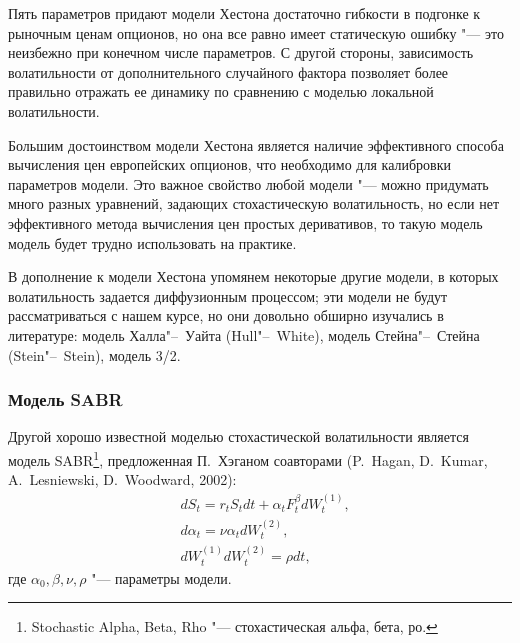 Пять параметров придают модели Хестона достаточно гибкости в подгонке к рыночным ценам опционов, но она все равно имеет статическую ошибку "--- это неизбежно при конечном числе параметров.
С другой стороны, зависимость волатильности от дополнительного случайного фактора позволяет более правильно отражать ее динамику по сравнению с моделью локальной волатильности. 

Большим достоинством модели Хестона является наличие эффективного способа вычисления цен европейских опционов, что необходимо для калибровки параметров модели.
Это важное свойство любой модели "--- можно придумать много разных уравнений, задающих стохастическую волатильность, но если нет эффективного метода вычисления цен простых деривативов, то такую модель модель будет трудно использовать на практике.


В дополнение к модели Хестона упомянем некоторые другие модели, в которых волатильность задается диффузионным процессом; эти модели не будут рассматриваться с нашем курсе, но они довольно обширно изучались в литературе: модель Халла"--~Уайта (Hull"--~White), модель Стейна"--~Стейна (Stein"--~Stein), модель 3/2.


\subsubsection{Модель SABR}

Другой хорошо известной моделью стохастической волатильности является модель SABR\footnote{Stochastic Alpha, Beta, Rho "--- стохастическая альфа, бета, ро.}, предложенная П.~Хэганом  соавторами (P.~Hagan, D.~Kumar, A.~Lesniewski, D.~Woodward, 2002):
\begin{align*}
&d S_t = r_t S_t dt + \alpha_t F_t^\beta d W_t^{(1)},\\
&d\alpha_t = \nu\alpha_t d W_t^{(2)},\\
&d W_t^{(1)} d W_t^{(2)} = \rho dt,
\end{align*}
где $\alpha_0,\beta,\nu,\rho$ "--- параметры модели.

